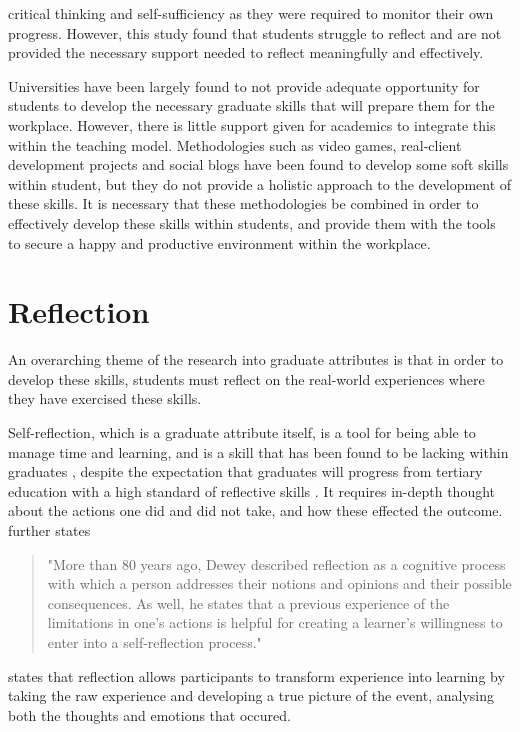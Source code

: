 \documentclass{l4proj}
\begin{document}
critical thinking and self-sufficiency as they were required to monitor their own progress. 
However, this study found that students struggle to reflect and are not provided the necessary 
support needed to reflect meaningfully and effectively. 
\par 
Universities have been largely found to not provide adequate opportunity for students to 
develop the necessary graduate skills that will prepare them for the workplace. However, there is 
little support given for academics to integrate this within the teaching model. Methodologies such 
as video games, real-client development projects and social blogs have been found to develop some 
soft skills within student, but they do not provide a holistic approach to the development of 
these skills. It is necessary that these methodologies be combined in order to effectively 
develop these skills within students, and provide them with the tools to secure a happy and 
productive environment within the workplace.

\section{Reflection} \label{backgroundReflection}

An overarching theme of the research into graduate attributes is that in order to develop these skills, students must reflect on the real-world 
experiences where they have exercised these skills. 

Self-reflection, which is a graduate attribute itself, is a tool for being able to manage time and learning, and is a skill that has
been found to be lacking within graduates \citep{thurner_development_2020}, despite the expectation that graduates will progress from tertiary 
education with a high standard of reflective skills \citep{bruno_reflective_2018}. It requires in-depth thought about the actions one did and did 
not take, and how these effected the outcome. \citet{thurner_development_2020} further states 
\begin{quotation}
    "More than 80 years ago, Dewey described reflection as a cognitive process with which a person addresses their notions and opinions and their 
    possible consequences. As well, he states that a previous experience of the limitations in one’s actions is helpful for creating a learner’s 
    willingness to enter into a self-reflection process."
\end{quotation}

\citet{boud_using_2001} states that reflection allows participants to transform experience into learning by taking the raw experience and developing a true
picture of the event, analysing both the thoughts and emotions that occured. 
\end{document}
